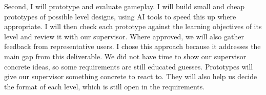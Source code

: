\documentclass[12pt]{article}
\begin{document}
\begin{enumerate}
    Second, I will prototype and evaluate gameplay. I will build small
    and cheap prototypes of possible level designs, using AI tools to
    speed this up where appropriate. I will then check each prototype
    against the learning objectives of its level and review it with
    our supervisor. Where approved, we will also gather feedback from
    representative users. I chose this approach because it addresses
    the main gap from this deliverable. We did not have time to show
    our supervisor concrete ideas, so some requirements are still
    educated guesses. Prototypes will give our supervisor something
    concrete to react to. They will also help us decide the format of
    each level, which is still open in the requirements.

\end{enumerate}

\newpage




\newpage
\end{document}
